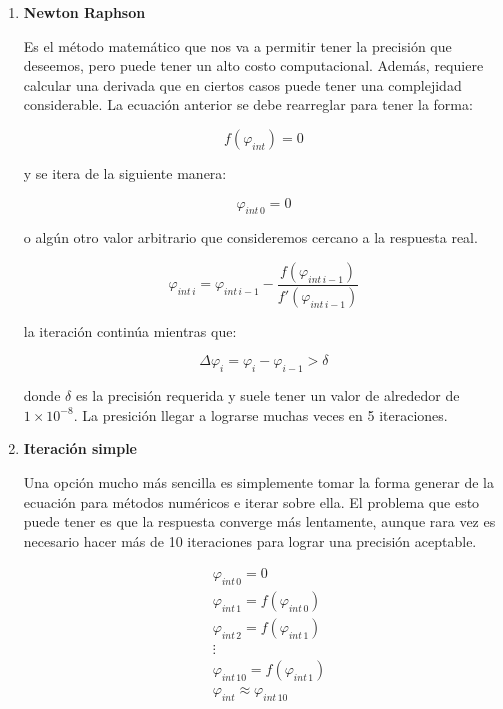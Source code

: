 \documentclass[11pt]{article}
\begin{document}
\begin{enumerate}
    \item
    \textbf{Newton Raphson}

    Es el método matemático que nos va a permitir tener la precisión que deseemos, pero puede tener un alto costo computacional. Además, requiere calcular una derivada que en ciertos casos puede tener una complejidad considerable. La ecuación anterior se debe rearreglar para tener la forma:

    \[ f \left( \varphi _{ int } \right) = 0 \]

    y se itera de la siguiente manera:

    \[ \varphi _{ int \, 0 } = 0 \]

    o algún otro valor arbitrario que consideremos cercano a la respuesta real.

    \[ \varphi _{ int \, i } = \varphi _{ int \, i - 1 } - \frac{ f \left( \varphi _{ int \, i - 1 } \right) }{ f' \left( \varphi _{ int \, i - 1 } \right) } \]

    la iteración continúa mientras que:

    \[ \Delta \varphi_i = \varphi _i - \varphi _{ i - 1 } > \delta \]

    donde $ \delta $ es la precisión requerida y suele tener un valor de alrededor de $ 1 \times 10 ^{ -8 } $. La presición llegar a lograrse muchas veces en 5 iteraciones.

    \item
    \textbf{Iteración simple}

    Una opción mucho más sencilla es simplemente tomar la forma generar de la ecuación para métodos numéricos e iterar sobre ella. El problema que esto puede tener es que la respuesta converge más lentamente, aunque rara vez es necesario hacer más de 10 iteraciones para lograr una precisión aceptable.

    \[ \begin{aligned}
        & \varphi _{ int \, 0 } = 0 \\
        & \varphi _{ int \, 1 } = f \left( \varphi _{ int \, 0 } \right) \\ 
        & \varphi _{ int \, 2 } = f \left( \varphi _{ int \, 1 } \right) \\ 
        & \vdots \\
        & \varphi _{ int \, 10 } = f \left( \varphi _{ int \, 1 } \right) \\ 
        & \varphi _{ int } \approx \varphi _{ int \, 10 }
    \end{aligned} \]


\end{enumerate}
\end{document}
